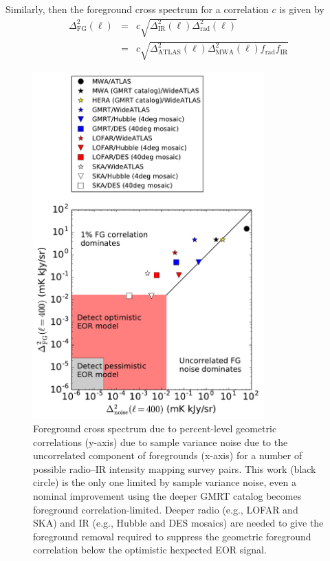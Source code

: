 \documentclass[numberedappendix]{emulateapj}
\newcommand{\rad}{\text{rad}}
\newcommand{\IR}{\text{IR}}
\newcommand{\ir}{\text{IR}}
\providecommand{\DIFaddbeginFL}{} %
\providecommand{\DIFaddendFL}{} %
\providecommand{\DIFdelbeginFL}{} %
\providecommand{\DIFdelendFL}{} %
\begin{document}
Similarly, then the foreground cross spectrum for a correlation $c$ is given by
\begin{eqnarray}
\Delta^2_\text{FG}(\ell)& =&c\sqrt{\Delta^2_\IR(\ell) \Delta^2_\rad(\ell)} \nonumber \\
&=&c\sqrt{\Delta^2_{\text{ATLAS}}(\ell) \Delta^2_{\text{MWA}}(\ell)f_\rad f_\ir }
\end{eqnarray}

\begin{figure}[h]
\centering
\DIFdelbeginFL %
\DIFdelendFL \DIFaddbeginFL \includegraphics[width=3.5in]{chap5_xcor/noise_vs_corr_expt_study.pdf}
\DIFaddendFL \caption[Experimental design study for 21\,cm--Ly$\alpha$ cross spectrum measurements, weighting foreground cross spectra due to flux correlatians against foreground sample variance.]{Foreground cross spectrum due to percent-level geometric correlations (y-axis) due to sample variance noise due to the uncorrelated component of foregrounds (x-axis) for a number of possible radio--IR intensity mapping survey pairs. This work (black circle) is the only one limited by sample variance noise, even a nominal improvement using the deeper GMRT catalog becomes foreground correlation-limited. Deeper radio (e.g., LOFAR and SKA) and IR (e.g., Hubble and DES mosaics) are needed to give the foreground removal required to suppress the geometric foreground correlation below the optimistic hexpected EOR signal.}
\label{fig:noisecorrstudy}
\end{figure}
\end{document}
